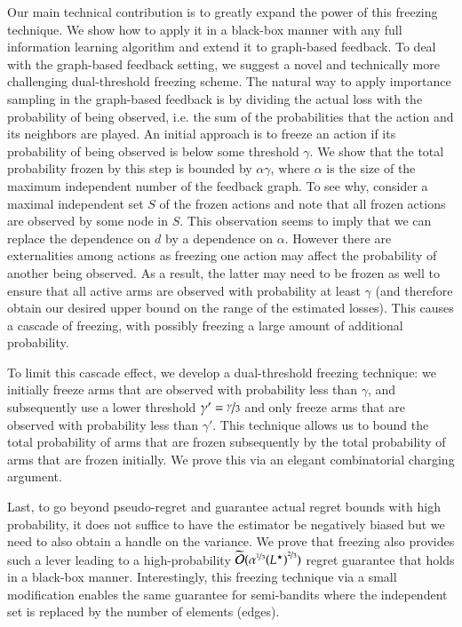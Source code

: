 Our main technical contribution is to greatly expand the power of this freezing technique. We show how to apply it in a black-box manner with any full information learning algorithm and 
extend it to graph-based feedback. To deal with the graph-based feedback setting, we suggest a novel and technically more challenging dual-threshold freezing scheme. The natural way to apply importance sampling in the graph-based feedback is by dividing the actual loss with the probability of being observed, i.e. the sum of the probabilities that the action and its neighbors are played. An initial approach is to freeze an action if its probability of being observed is below some threshold $\gamma$. We show that the total probability frozen by this step is bounded by $\alpha\gamma$, where $\alpha$ is the size of the maximum independent number of the feedback graph. To see why, consider a maximal independent set $S$ of the frozen actions and note that all frozen actions are observed by some node in $S$. 
This observation seems to imply that we can replace the dependence on $d$ by a dependence on $\alpha$. However there are externalities among actions as freezing one action may affect the probability of another being observed. As a result, the latter may need to be frozen as well to ensure that all active arms are observed with probability at least $\gamma$ (and therefore obtain our desired upper bound on the range of the estimated losses). This causes a cascade of freezing, with possibly freezing a large amount of additional probability. 

To limit this cascade effect, we develop a dual-threshold 
freezing technique: we initially freeze arms that are observed with probability less than $\gamma$, and subsequently use a lower threshold $\gamma'=\nicefrac{\gamma}{3}$ and only freeze arms
that are observed with probability less than $\gamma'$. This technique allows us to bound the total probability of arms 
that are frozen subsequently by the total probability of arms 
that are frozen initially. We prove this via an elegant combinatorial charging argument.


Last, to go beyond pseudo-regret and guarantee actual regret bounds with high probability, it does not suffice to have the estimator be 
negatively biased but we need to also obtain a handle on the variance. We prove that freezing also provides such a lever leading to a high-probability 
$\widetilde{\bigO}{(\alpha^{\nicefrac{1}{3}}\prn*{L^{\star}}^{\nicefrac{2}{3}})}$
regret guarantee that holds in a black-box manner. Interestingly, this freezing technique via a small modification enables the same guarantee for semi-bandits where the independent set is replaced by the number of elements (edges). 

